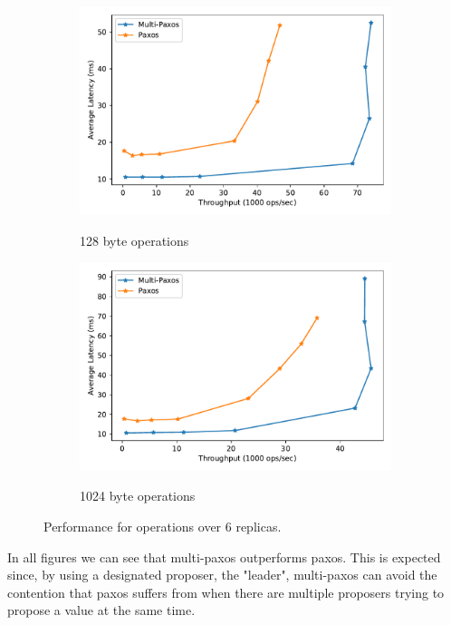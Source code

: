 \documentclass[sigconf]{acmart}
\begin{document}
\begin{figure}[htp]
    
\begin{subfigure}{\linewidth}
    \centering
    \caption{128 byte operations}
    \includegraphics[width=\textwidth]{6R_128B.pdf}
    \label{fig:6replicas-128}
\end{subfigure}

\begin{subfigure}{\linewidth}
    \centering
    \caption{1024 byte operations}
    \includegraphics[width=\textwidth]{6R_1024B.pdf}
    \label{fig:6replicas-1024}
\end{subfigure}

\caption{Performance for operations over 6 replicas.}
\label{fig:6replicas}

\end{figure}

In all figures we can see that multi-paxos outperforms paxos.
This is expected since, by using a designated proposer, the "leader", multi-paxos can avoid the contention that paxos suffers from when there are multiple proposers trying to propose a value at the same time.
\end{document}

